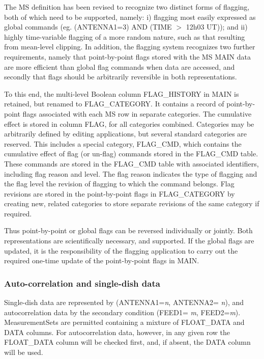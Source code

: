 \documentclass{article}
\begin{document}
 The MS definition has been revised to recognize two distinct forms of
flagging, both of which need to be supported, namely: i) flagging most
easily expressed as global commands (eg. (ANTENNA1=3) AND (TIME $>$
12h03 UT)); and ii) highly time-variable flagging of a more random
nature, such as that resulting from mean-level clipping. In addition,
the flagging system recognizes two further requirements, namely that
point-by-point flags stored with the MS MAIN data are more efficient
than global flag commands when data are accessed, and secondly that
flags should be arbitrarily reversible in both representations.

 To this end, the multi-level Boolean column FLAG\_HISTORY in MAIN is
retained, but renamed to FLAG\_CATEGORY. It contains a record of
point-by-point flags associated with each MS row in separate
categories. The cumulative effect is stored in column FLAG, for all
categories combined. Categories may be arbitrarily defined by editing
applications, but several standard categories are reserved. This
includes a special category, FLAG\_CMD, which contains the cumulative
effect of flag (or un-flag) commands stored in the FLAG\_CMD
table. These commands are stored in the FLAG\_CMD table with
associated identifiers, including flag reason and level. The flag
reason indicates the type of flagging and the flag level the revision
of flagging to which the command belongs. Flag revisions are stored in
the point-by-point flags in FLAG\_CATEGORY by creating new, related
categories to store separate revisions of the same category if
required.

 Thus point-by-point or global flags can be reversed individually or
jointly. Both representations are scientifically necessary, and
supported. If the global flags are updated, it is the responsibility
of the flagging application to carry out the required one-time update
of the point-by-point flags in MAIN.

\subsubsection{Auto-correlation and single-dish data}

Single-dish data are represented by (ANTENNA1={\it n}, ANTENNA2= {\it
n}), and autocorrelation data by the secondary condition (FEED1={\it
m}, FEED2={\it m}). MeasurementSets are permitted containing a mixture
of FLOAT\_DATA and DATA columns. For autocorrelation data, however, in
any given row the FLOAT\_DATA column will be checked first, and, if
absent, the DATA column will be used.
\end{document}
